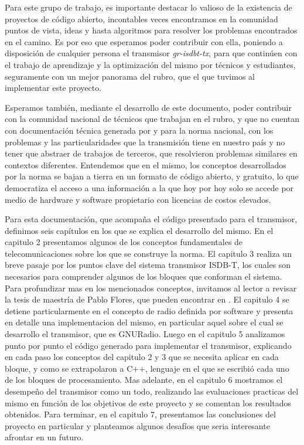 Para este grupo de trabajo, es importante destacar lo valioso de la existencia de proyectos de código abierto, incontables veces encontramos en la comunidad puntos de vista, ideas y hasta algoritmos para resolver los problemas encontrados en el camino. Es por eso que esperamos poder contribuir con ella, poniendo a disposición de cualquier persona el transmisor \textit{gr-isdbt-tx}, para que continúen con el trabajo de aprendizaje y la optimización del mismo por técnicos y estudiantes, seguramente con un mejor panorama del rubro, que el que tuvimos al implementar este proyecto.

Esperamos también, mediante el desarrollo de este documento, poder contribuir con la comunidad nacional de técnicos que trabajan en el rubro, y que no cuentan con documentación técnica generada por y para la norma nacional, con los problemas y las particularidades que la transmisión tiene en nuestro país y no tener que abstraer de trabajos de terceros, que resolvieron problemas similares en contextos diferentes. Entendemos que en el mismo, los conceptos desarrollados por la norma se bajan a tierra en un formato de código abierto, y gratuito, lo que democratiza el acceso a una información a la que hoy por hoy solo se accede por medio de hardware y software propietario con licencias de costos elevados.

Para esta documentación, que acompaña el código presentado para el transmisor, definimos seis capítulos en los que se explica el desarrollo del mismo. En el capitulo 2 presentamos algunos de los conceptos fundamentales de telecomunicaciones sobre los que se construye la norma. El capitulo 3 realiza un breve pasaje por los puntos clave del sistema transmisor ISDB-T, los cuales son necesarios para comprender algunos de los bloques que conforman el sistema. Para profundizar mas en los mencionados conceptos, invitamos al lector a revisar la tesis de maestría de Pablo Flores, que pueden encontrar en \cite{gr-isdbt}. El capitulo 4 se detiene particularmente en el concepto de radio definida por software y  presenta en detalle una implementacion del mismo, en particular aquel sobre el cual se desarrollo el transmisor, que es GNURadio. Luego en el capitulo 5 analizamos punto por punto el código generado para implementar el transmisor, explicando en cada paso los conceptos del capitulo 2 y 3 que se necesita aplicar en cada bloque, y como se extrapolaron a C++, lenguaje en el que se escribió cada uno de los bloques de procesamiento. Mas adelante, en el capitulo 6 mostramos el desempeño del transmisor como un todo, realizando las evaluaciones practicas del mismo en función de los objetivos de este proyecto y se comentan los resultados obtenidos. Para terminar, en el capitulo 7, presentamos las conclusiones del proyecto en particular y planteamos algunos desafíos que seria interesante afrontar en un futuro.






